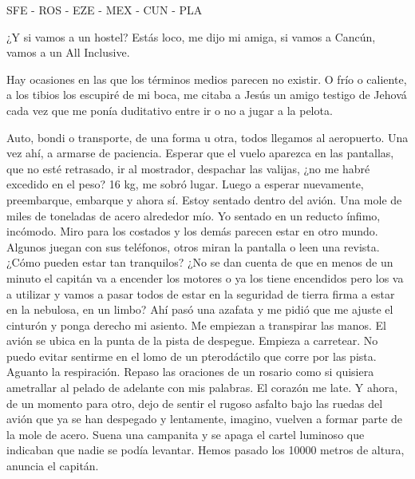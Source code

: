 \documentclass[11pt,twoside,openright,a6paper]{book}
\begin{document}
\vspace{0.5cm}
\hrulefill\hspace{0.2cm} \decofourleft\decofourright \hspace{0.2cm} \hrulefill
\vspace{0.5cm}

SFE - ROS - EZE - MEX - CUN - PLA


\vspace{0.5cm}
\hrulefill\hspace{0.2cm} \decofourleft\decofourright \hspace{0.2cm} \hrulefill
\vspace{0.5cm}

¿Y si vamos a un hostel? Estás loco, me dijo mi amiga, si vamos a Cancún,
vamos a un All Inclusive.

Hay ocasiones en las que los términos medios parecen no existir. O frío
o caliente, a los tibios los escupiré de mi boca, me citaba a Jesús un
amigo testigo de Jehová cada vez que me ponía duditativo entre ir o no
a jugar a la pelota.


\vspace{0.5cm}
\hrulefill\hspace{0.2cm} \decofourleft\decofourright \hspace{0.2cm} \hrulefill
\vspace{0.5cm}

Auto, bondi o transporte, de una forma u otra, todos llegamos al
aeropuerto. Una vez ahí, a armarse de paciencia. Esperar que el vuelo
aparezca en las pantallas, que no esté retrasado, ir al mostrador,
despachar las valijas, ¿no me habré excedido en el peso? 16 kg, me sobró
lugar. Luego a esperar nuevamente, preembarque, embarque y ahora sí. Estoy
sentado dentro del avión. Una mole de miles de toneladas de acero alrededor
mío. Yo sentado en un reducto ínfimo, incómodo. Miro para los costados y
los demás parecen estar en otro mundo. Algunos juegan con sus teléfonos,
otros miran la pantalla o leen una revista. ¿Cómo pueden estar tan
tranquilos? ¿No se dan cuenta de que en menos de un minuto el capitán va
a encender los motores o ya los tiene encendidos pero los va a utilizar y
vamos a pasar todos de estar en la seguridad de tierra firma a estar en la
nebulosa, en un limbo? Ahí pasó una azafata y me pidió que me ajuste el
cinturón y ponga derecho mi asiento. Me empiezan a transpirar las manos. El
avión se ubica en la punta de la pista de despegue. Empieza a carretear. No
puedo evitar sentirme en el lomo de un pterodáctilo que corre por las
pista. Aguanto la respiración. Repaso las oraciones de un rosario como si
quisiera ametrallar al pelado de adelante con mis palabras. El corazón me
late. Y ahora, de un momento para otro, dejo de sentir el rugoso asfalto
bajo las ruedas del avión que ya se han despegado y lentamente, imagino,
vuelven a formar parte de la mole de acero. Suena una campanita y se apaga
el cartel luminoso que indicaban que nadie se podía levantar. Hemos pasado
los 10000 metros de altura, anuncia el capitán.
\end{document}

